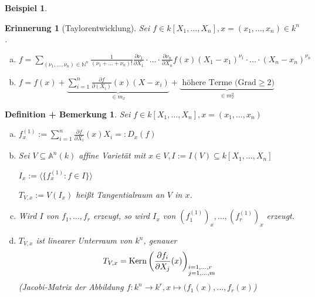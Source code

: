 \documentclass[a4paper, 12pt, numbers=noendperiod, chapterprefix=true, headsepline]{scrbook}
\theoremstyle{break}
\newtheorem{DefBem}[Def]{Definition + Bemerkung}
\newtheorem{Erinn}[Def]{Erinnerung}
\newtheorem{Bsp}[Def]{Beispiel}
\theoremstyle{nonumberbreak}
\theoremstyle{nonumberplain}
\newcommand{\Sum}{\sum\limits}
\DeclareMathOperator{\Kern}{Kern}
\newcommand{\N}{\mathbb{N}}
\newcommand{\A}{\mathbb{A}}
\begin{document}
\begin{Bsp}
\begin{enumerate}[a)]
\begin{minipage}{0.3\linewidth}
\begin{flushright}
\end{flushright}\end{minipage}
\end{enumerate}\end{Bsp}

\begin{Erinn}[Taylorentwicklung]
Sei $f\in k[X_1,\ldots ,X_n], x=(x_1,\ldots ,x_n)\in k^n$.\begin{enumerate}[a)]
\item
	$f=\Sum_{(\nu_1,\ldots ,\nu_n)\in \N^n} \frac{1}{(\nu_1+\ldots +\nu_n)!}\frac{\partial\nu_1}{\partial X_1}\cdot\ldots \cdot \frac{\partial\nu_n}{\partial X_n} f(x)(X_1-x_1)^{\nu_1}\cdot\ldots \cdot(X_n-x_n)^{\nu_n}$
\item
	$f=f(x)+ \underbrace{\Sum_{i=1}^n\frac{\partial f}{\partial(X_i)}(x)(X-x_i)}_{\in m_x} + \underbrace{\text{ h\"ohere Terme (Grad} \ge2)}_{\in m_x^2}$
\end{enumerate}\end{Erinn}

\begin{DefBem}\label{16.3}
Sei $f \in k[X_1,\ldots ,X_n], x=(x_1,\ldots ,x_n)$\begin{enumerate}[a)]
\item
	$f_x^{(1)}:=\Sum_{i=1}^n\frac{\partial f}{\partial X_i}(x)X_i =:D_x(f)$
\item
	Sei $V\subseteq \A^n(k)$ affine Variet\"at mit $x\in V, I:=I(V)\subseteq k[X_1,\ldots ,X_n]$
	
	$I_x:=\langle\{f_x^{(1)}:f\in I\}\rangle$
	
	$T_{V,x}:=V(I_x)$ hei\ss t Tangentialraum an $V$ in $x$.
\item
	Wird $I$ von $f_1,\ldots ,f_r$ erzeugt, so wird $I_x$ von $(f_1^{(1)})_x,\ldots ,(f_r^{(1)})_x$ erzeugt.
\item\label{16.3d}
	$T_{V,x}$ ist linearer Unterraum von $k^n$, genauer
		\[ T_{V,x}=\Kern\left( \frac{\partial f_i}{\partial X_j}(x) \right)_{\begin{subarray}{l}i=1,\ldots ,r\\j=1,\ldots ,m\end{subarray}}\]
	(Jacobi-Matrix der Abbildung $f:k^n\to k^r, x\mapsto(f_1(x),\ldots ,f_r(x)$)
\end{enumerate}\end{DefBem}
\end{document}
